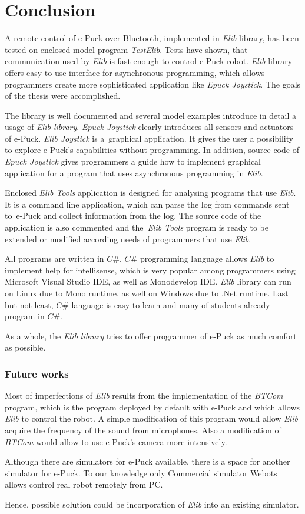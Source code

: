 \chapter{Conclusion} \label{chap:conclusion}
  A remote control of e-Puck over Bluetooth, implemented in {\it Elib} library, 
  has been tested on enclosed model program {\it TestElib}. 
  Tests have shown, that communication used by {\it Elib} is fast enough
  to control e-Puck robot.
  {\it Elib} library offers easy to use interface for asynchronous programming,
  which allows programmers create more sophisticated application like {\it Epuck Joystick}.
  The goals of the thesis were accomplished.
  
  The library is well documented and several model examples introduce in detail
  a usage of {\it Elib library}.
  {\it Epuck Joystick} clearly introduces all sensors and actuators of e-Puck. 
  {\it Elib Joystick} is a~graphical application.
  It gives the user a possibility to explore e-Puck's capabilities without programming.
  In addition, source code of {\it Epuck Joystick} gives programmers a guide 
  how to implement graphical application for a program 
  that uses asynchronous programming in {\it Elib}. 

  Enclosed {\it Elib Tools} application is designed for analysing
  programs that use {\it Elib}.
  It is a command line application, which can parse the log from commands sent 
  to~e-Puck and collect information from the log.
  The source code of the application is also commented and 
  the~{\it Elib Tools} program is ready to be extended 
  or modified according needs of programmers that use {\it Elib}.
  
  All programs are written in $C\#$.  $C\#$ programming language
  allows {\it Elib} to implement help for intellisense,
  which is very popular among programmers using Microsoft Visual Studio IDE,
  as well as Monodevelop IDE. {\it Elib} library can run on Linux due to
  Mono runtime, as well on Windows due to .Net runtime.
  Last but not least, $C\#$ language is easy to learn 
  and many of students already program in $C\#$.

  As a whole, the {\it Elib library} tries to offer programmer
  of e-Puck as much comfort as possible.

\subsection*{Future works}
  Most of imperfections of {\it Elib} results from the implementation 
  of the {\it BTCom} program, which is the program deployed by default with e-Puck 
  and which allows {\it Elib} to control the robot.
  A simple modification of this program would allow {\it Elib} acquire the frequency 
  of the sound from microphones.
  Also a modification of {\it BTCom} would allow to use e-Puck's camera more intensively.

  Although there are simulators for e-Puck available, 
  there is a space for another simulator for e-Puck. To our knowledge only
  Commercial simulator Webots allows control real robot remotely from PC. 

  Hence, possible solution could be incorporation of {\it Elib} into an existing simulator.

